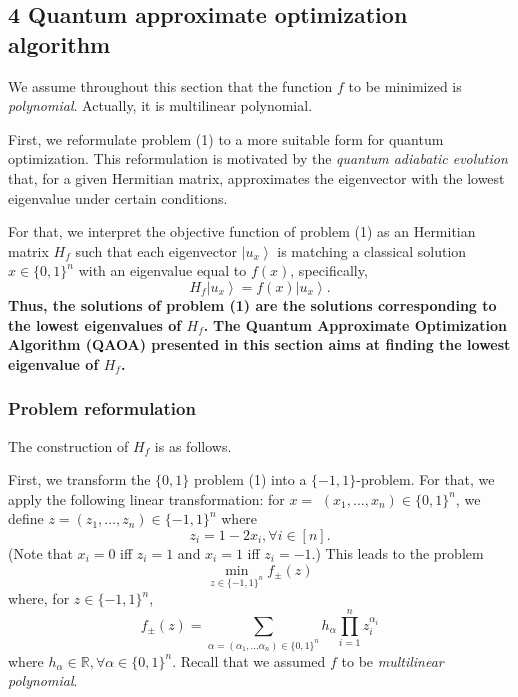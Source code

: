 \subsection{4 Quantum approximate optimization algorithm}

We assume throughout this section that the function $f$ to be minimized is \textit{polynomial}. Actually, it is multilinear polynomial.

First, we reformulate problem (1) to a more suitable form for quantum optimization. This reformulation is motivated by the \textit{quantum adiabatic evolution} that, for a given Hermitian matrix, approximates the eigenvector with the lowest eigenvalue under certain conditions. 

For that, we interpret the objective function of problem (1) as an Hermitian matrix $H_{f}$ such that each eigenvector $\left|u_{x}\right\rangle$ is matching a classical solution $x \in\{0,1\}^{n}$ with an eigenvalue equal to $f(x)$, specifically,
$$
H_{f}\left|u_{x}\right\rangle=f(x)\left|u_{x}\right\rangle .
$$
\textbf{Thus, the solutions of problem (1) are the solutions corresponding to the lowest eigenvalues of $H_{f}$.} \textbf{The Quantum Approximate Optimization Algorithm (QAOA) presented in this section aims at finding the lowest eigenvalue of $H_{f}$.} %

\subsubsection{Problem reformulation}

The construction of $H_{f}$ is as follows. 

First, we transform the $\{0,1\}$ problem (1) into a $\{-1,1\}$-problem. For that, we apply the following linear transformation: for $x=$ $\left(x_{1}, \ldots, x_{n}\right) \in\{0,1\}^{n}$, we define $z=\left(z_{1}, \ldots, z_{n}\right) \in\{-1,1\}^{n}$ where
\begin{equation*}
z_{i}=1-2 x_{i}, \forall i \in[n]. \tag{20}
\end{equation*}
(Note that $x_{i}=0$ iff $z_i=1$ and $x_{i}=1$ iff $z_i=-1.$) This leads to the problem
$$
\min _{z \in\{-1,1\}^{n}} f_{ \pm}(z)
$$
where, for $z \in\{-1,1\}^{n}$,
$$
f_{ \pm}(z)=\sum_{\alpha=\left(\alpha_{1}, \ldots \alpha_{n}\right) \in\{0,1\}^{n}} h_{\alpha} \prod_{i=1}^{n} z_{i}^{\alpha_{i}}
$$
where $h_{\alpha} \in \mathbb{R}, \forall \alpha \in\{0,1\}^{n}$. Recall that we assumed $f$ to be \textit{multilinear polynomial}. %

